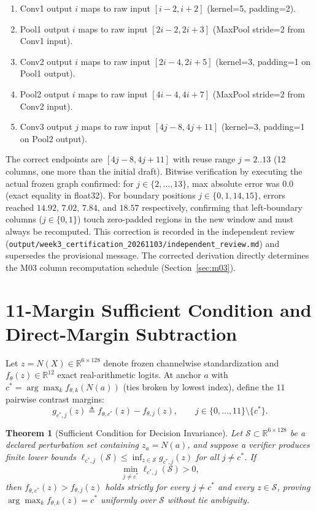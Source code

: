\documentclass[11pt,oneside,a4paper]{report}
\newcommand{\R}{\mathbb{R}}
\newcommand{\code}[1]{{\small\upshape\ttfamily #1}}
\newcommand{\pathcode}[1]{{\small\upshape\ttfamily\nolinkurl{#1}}}
\newcommand{\Sset}{\mathcal{S}}
\newtheorem{theorem}[definition]{Theorem}
\theoremstyle{remark}
\begin{document}
\begin{enumerate}[leftmargin=1.5em]
  \item Conv1 output $i$ maps to raw input $[i{-}2, i{+}2]$ (kernel=5, padding=2).
  \item Pool1 output $i$ maps to raw input $[2i{-}2, 2i{+}3]$ (MaxPool stride=2 from Conv1 input).
  \item Conv2 output $i$ maps to raw input $[2i{-}4, 2i{+}5]$ (kernel=3, padding=1 on Pool1 output).
  \item Pool2 output $i$ maps to raw input $[4i{-}4, 4i{+}7]$ (MaxPool stride=2 from Conv2 input).
  \item Conv3 output $j$ maps to raw input $[4j{-}8, 4j{+}11]$ (kernel=3, padding=1 on Pool2 output).
\end{enumerate}

The correct endpoints are $[4j{-}8, 4j{+}11]$ with reuse range $j=2..13$ (12 columns, one more than the initial draft). Bitwise verification by executing the actual frozen graph confirmed: for $j \in \{2,\ldots,13\}$, max absolute error was $0.0$ (exact equality in \code{float32}). For boundary positions $j \in \{0,1,14,15\}$, errors reached $14.92$, $7.02$, $7.84$, and $18.57$ respectively, confirming that left-boundary columns ($j \in \{0,1\}$) touch zero-padded regions in the new window and must always be recomputed. This correction is recorded in the independent review (\pathcode{output/week3_certification_20261103/independent_review.md}) and supersedes the provisional message. The corrected derivation directly determines the \code{M03} column recomputation schedule (Section~\ref{sec:m03}).

\section{11-Margin Sufficient Condition and Direct-Margin Subtraction}
Let $z = N(X) \in \R^{6 \times 128}$ denote frozen channelwise standardization and $f_\theta(z) \in \R^{12}$ exact real-arithmetic logits. At anchor $a$ with $c^* = \arg\max_k f_{\theta,k}(N(a))$ (ties broken by lowest index), define the $11$ pairwise contrast margins:
\begin{equation}
g_{c^*,j}(z) \triangleq f_{\theta,c^*}(z) - f_{\theta,j}(z), \qquad j \in \{0,\dots,11\}\setminus\{c^*\}.
\end{equation}

\begin{theorem}[Sufficient Condition for Decision Invariance]\label{thm:margin}
Let $\Sset \subset \R^{6\times 128}$ be a declared perturbation set containing $z_a = N(a)$, and suppose a verifier produces finite lower bounds $\ell_{c^*,j}(\Sset) \le \inf_{z \in \Sset} g_{c^*,j}(z)$ for all $j \neq c^*$. If
\begin{equation}
\min_{j \neq c^*} \ell_{c^*,j}(\Sset) > 0,
\end{equation}
then $f_{\theta,c^*}(z) > f_{\theta,j}(z)$ holds strictly for every $j \neq c^*$ and every $z \in \Sset$, proving $\arg\max_k f_{\theta,k}(z) = c^*$ uniformly over $\Sset$ without tie ambiguity.
\end{theorem}
\end{document}
